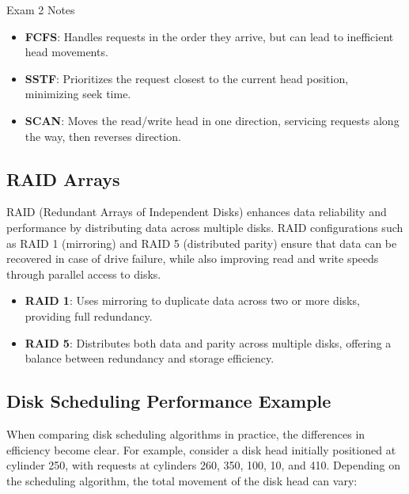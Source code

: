 \begin{examnotes}{Exam 2 Notes}
    \begin{highlight}
        \begin{itemize}
            \item \textbf{FCFS}: Handles requests in the order they arrive, but can lead to inefficient head movements.
            \item \textbf{SSTF}: Prioritizes the request closest to the current head position, minimizing seek time.
            \item \textbf{SCAN}: Moves the read/write head in one direction, servicing requests along the way, then reverses direction.
        \end{itemize}
    \end{highlight}
    
    \subsection*{RAID Arrays}
    
    RAID (Redundant Arrays of Independent Disks) enhances data reliability and performance by distributing data across multiple disks. RAID configurations such as RAID 1 (mirroring) and RAID 5 (distributed parity) ensure that data can be recovered in case of drive failure, while also improving read and write speeds through parallel access to disks.
    
    \begin{highlight}
        \begin{itemize}
            \item \textbf{RAID 1}: Uses mirroring to duplicate data across two or more disks, providing full redundancy.
            \item \textbf{RAID 5}: Distributes both data and parity across multiple disks, offering a balance between redundancy and storage efficiency.
        \end{itemize}
    \end{highlight}
    
    \subsection*{Disk Scheduling Performance Example}
    
    When comparing disk scheduling algorithms in practice, the differences in efficiency become clear. For example, consider a disk head initially positioned at cylinder 250, with requests at cylinders 260, 350, 100, 10, and 410. Depending on the scheduling algorithm, the total movement of the disk head can vary:
    

\end{examnotes}
